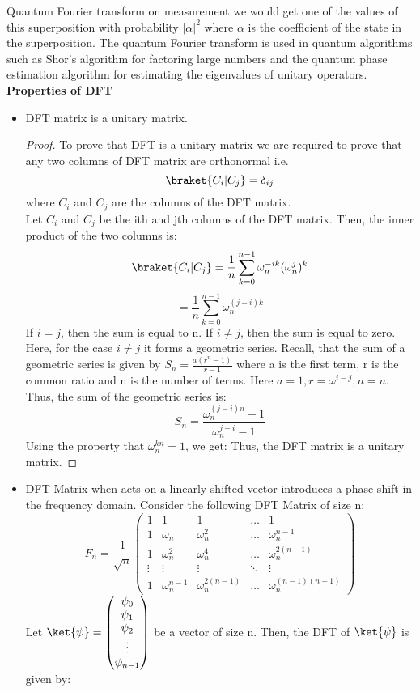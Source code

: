 \documentclass[12pt, oneside]{book}
\theoremstyle{definition}
\theoremstyle{definition}
\theoremstyle{remark}
\begin{document}
Quantum Fourier transform on measurement we would get one of the values of this superposition with probability $|\alpha|^2$ where $\alpha$ is the coefficient of the state in the superposition. The quantum Fourier transform is used in quantum algorithms such as Shor's algorithm for factoring large numbers and the quantum phase estimation algorithm for estimating the eigenvalues of unitary operators.\\
\textbf{Properties of DFT}
\begin{itemize}
    \item DFT matrix is a unitary matrix.
    \begin{proof} To prove that DFT is a unitary matrix we are required to prove that any two columns of DFT matrix are orthonormal i.e. 
    \[ \braket{C_i|C_j}=\delta_{ij} \]
    where $C_i$ and $C_j$ are the columns of the DFT matrix.\\
    Let $C_i$ and $C_j$ be the ith and jth columns of the DFT matrix. Then, the inner product of the two columns is:
    \[ \braket{C_i|C_j}=\dfrac{1}{n}\sum_{k=0}^{n-1}\omega_n^{-ik}(\omega_n^{j})^k \]
    \[ =\dfrac{1}{n}\sum_{k=0}^{n-1}\omega_n^{(j-i)k} \]
    If $i=j$, then the sum is equal to n. If $i\neq j$, then the sum is equal to zero. 
    Here, for the case $i \neq j$ it forms a geometric series. Recall, that the sum of a geometric series is given by $S_n=\frac{a(r^n-1)}{r-1}$
    where a is the first term, r is the common ratio and n is the number of terms. Here $a=1, r =\omega^{i-j},n=n$. Thus, the sum of the geometric series is:
    \[ S_n=\dfrac{\omega_n^{(j-i)n}-1}{\omega_n^{j-i}-1} \]
    Using the property that $\omega_n^{kn}=1$,  we get:
    Thus, the DFT matrix is a unitary matrix.
    \end{proof}
    \item DFT Matrix when acts on a linearly shifted vector introduces a phase shift in the frequency domain.
    Consider the following DFT Matrix of size n:
        \[ F_n=\dfrac{1}{\sqrt{n}}\begin{pmatrix} 1 & 1 & 1 & \ldots & 1 \\ 1 & \omega_n & \omega_n^2 & \ldots & \omega_n^{n-1} \\ 1 & \omega_n^2 & \omega_n^4 & \ldots & \omega_n^{2(n-1)} \\ \vdots & \vdots & \vdots & \ddots & \vdots \\ 1 & \omega_n^{n-1} & \omega_n^{2(n-1)} & \ldots & \omega_n^{(n-1)(n-1)} \end{pmatrix} \]
        Let $\ket{\psi}=\begin{pmatrix} \psi_0 \\ \psi_1 \\ \psi_2 \\ \vdots \\ \psi_{n-1} \end{pmatrix}$ be a vector of size n. Then, the DFT of $\ket{\psi}$ is given by:

\end{itemize}
\end{document}
